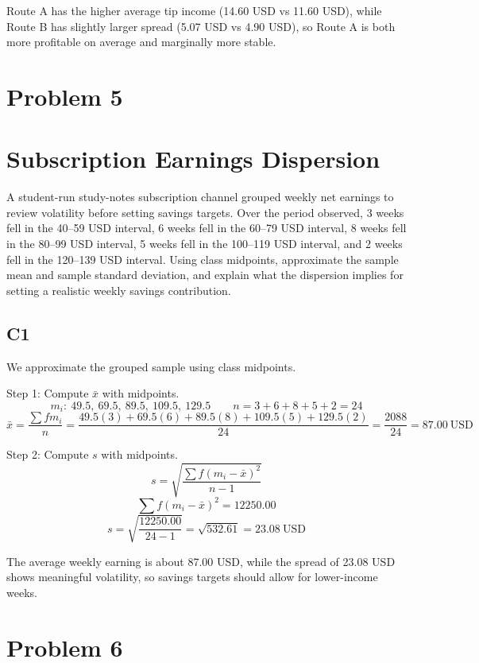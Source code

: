\begin{ExamProblems}
		Route A has the higher average tip income (14.60 USD vs 11.60 USD), while Route B has slightly larger spread (5.07 USD vs 4.90 USD), so Route A is both more profitable on average and marginally more stable.

		\newpage
		\item
		\section{Problem 5}
		\section{Subscription Earnings Dispersion}
		A student-run study-notes subscription channel grouped weekly net earnings to review volatility before setting savings targets. Over the period observed, 3 weeks fell in the 40--59 USD interval, 6 weeks fell in the 60--79 USD interval, 8 weeks fell in the 80--99 USD interval, 5 weeks fell in the 100--119 USD interval, and 2 weeks fell in the 120--139 USD interval. Using class midpoints, approximate the sample mean and sample standard deviation, and explain what the dispersion implies for setting a realistic weekly savings contribution.

		\subsection*{C1}
		We approximate the grouped sample using class midpoints.

		Step 1: Compute $\bar{x}$ with midpoints.
		\[
		m_i:\ 49.5,\ 69.5,\ 89.5,\ 109.5,\ 129.5
		\qquad
		n = 3+6+8+5+2 = 24
		\]
		\[
		\bar{x} = \frac{\sum f m_i}{n}
		= \frac{49.5(3)+69.5(6)+89.5(8)+109.5(5)+129.5(2)}{24}
		= \frac{2088}{24}
		= 87.00\ \text{USD}
		\]

		Step 2: Compute $s$ with midpoints.
		\[
		s = \sqrt{\frac{\sum f(m_i-\bar{x})^2}{n-1}}
		\]
		\[
		\sum f(m_i-\bar{x})^2 = 12250.00
		\]
		\[
		s = \sqrt{\frac{12250.00}{24-1}} = \sqrt{532.61} = 23.08\ \text{USD}
		\]

		The average weekly earning is about 87.00 USD, while the spread of 23.08 USD shows meaningful volatility, so savings targets should allow for lower-income weeks.

		\newpage
		\item
		\section{Problem 6}

\end{ExamProblems}
